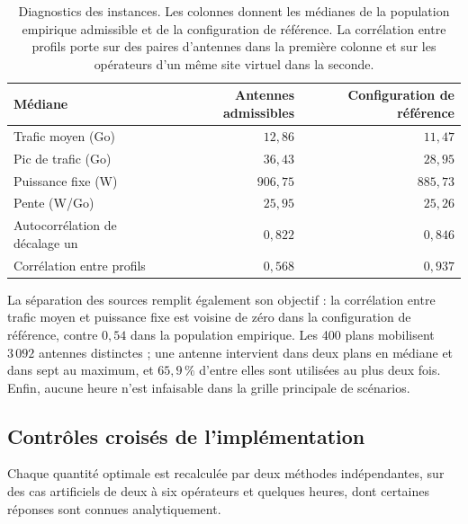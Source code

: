 \begin{table}[htbp]
\centering
\small
\begin{tabular}{lrr}
\hline
Médiane & Antennes admissibles & Configuration de référence \\
\hline
Trafic moyen (Go) & \(12{,}86\) & \(11{,}47\) \\
Pic de trafic (Go) & \(36{,}43\) & \(28{,}95\) \\
Puissance fixe (W) & \(906{,}75\) & \(885{,}73\) \\
Pente (W/Go) & \(25{,}95\) & \(25{,}26\) \\
Autocorrélation de décalage un & \(0{,}822\) & \(0{,}846\) \\
Corrélation entre profils & \(0{,}568\) & \(0{,}937\) \\
\hline
\end{tabular}
\caption{Diagnostics des instances. Les colonnes donnent les médianes de la
population empirique admissible et de la configuration de référence. La
corrélation entre profils porte sur des paires d'antennes dans la première
colonne et sur les opérateurs d'un même site virtuel dans la seconde.}
\label{tab:diagnostics_instances}
\end{table}

La séparation des sources remplit également son objectif : la corrélation
entre trafic moyen et puissance fixe est voisine de zéro dans la configuration
de référence, contre \(0{,}54\) dans la population empirique. Les 400 plans
mobilisent \(3\,092\) antennes distinctes ; une antenne intervient dans deux
plans en médiane et dans sept au maximum, et \(65{,}9\,\%\) d'entre elles sont
utilisées au plus deux fois. Enfin, aucune heure n'est infaisable dans la
grille principale de scénarios.

\subsection{Contrôles croisés de l'implémentation}

Chaque quantité optimale est recalculée par deux méthodes indépendantes, sur
des cas artificiels de deux à six opérateurs et quelques heures, dont
certaines réponses sont connues analytiquement.

